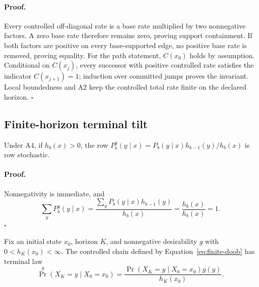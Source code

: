 \paragraph{Proof.}
Every controlled off-diagonal rate is a base rate multiplied by two
nonnegative factors. A zero base rate therefore remains zero, proving support
containment. If both factors are positive on every base-supported edge, no
positive base rate is removed, proving equality. For the path statement,
$C(x_0)$ holds by assumption. Conditional on $C(x_j)$, every successor with
positive controlled rate satisfies the indicator $C(x_{j+1})=1$; induction
over committed jumps proves the invariant. Local boundedness and A2 keep the
controlled total rate finite on the declared horizon.
\hfill$\square$

\subsection{Finite-horizon terminal tilt}
\label{sec:app-compose-terminal-proof}

\begin{composeappendixlemma}
\label{lem:app-compose-backward-normalization}
Under A4, if $h_b(x)>0$, the row
$P_b^g(y\mid x)=P_b(y\mid x)h_{b-1}(y)/h_b(x)$ is row stochastic.
\end{composeappendixlemma}

\paragraph{Proof.}
Nonnegativity is immediate, and
\[
  \sum_yP_b^g(y\mid x)
  =
  \frac{\sum_yP_b(y\mid x)h_{b-1}(y)}{h_b(x)}
  =
  \frac{h_b(x)}{h_b(x)}
  =
  1.
\]
\hfill$\square$

\begin{composeappendixproposition}
\label{prop:app-compose-terminal-tilt}
Fix an initial state $x_0$, horizon $K$, and nonnegative desirability $g$ with
$0<h_K(x_0)<\infty$.  The controlled chain defined by
Equation~\eqref{eq:finite-doob} has terminal law
\[
  \Pr^g(X_K=y\mid X_0=x_0)
  =
  \frac{\Pr(X_K=y\mid X_0=x_0)g(y)}{h_K(x_0)}.
\]
\end{composeappendixproposition}

